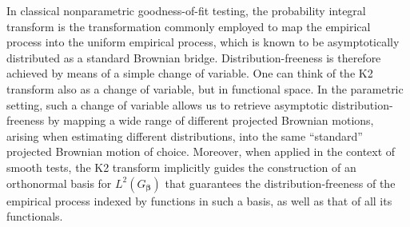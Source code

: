 \documentclass[11pt]{article}
\newcommand{\vect}[1]{\boldsymbol{#1}}
\begin{document}
In classical nonparametric goodness-of-fit testing, the probability integral transform is the transformation commonly employed to map the empirical process into the uniform empirical process, which is known to be asymptotically distributed as a standard Brownian bridge. Distribution-freeness is therefore achieved by means of a simple change of variable. One can think of the K2 transform also as a change of variable, but in functional space.  In the parametric setting, such a change of variable allows us to retrieve asymptotic distribution-freeness by mapping a wide range of different projected Brownian motions, arising when estimating different distributions, into the same ``standard'' projected Brownian motion of choice. 
Moreover, when applied in the context of smooth tests, the K2 transform implicitly guides the construction of an orthonormal basis for  $L^2(G_{\vect{\beta}})$ that guarantees the distribution-freeness of the empirical process indexed by functions in such a basis, as well as that of all its functionals.
\end{document}
